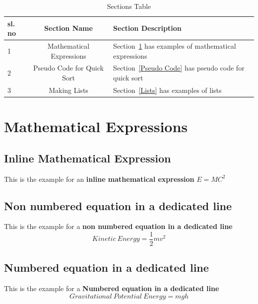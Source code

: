 \documentclass{article}
\begin{document}
\begin{table}                                                       %
    \centering
    \begin{tabular}{| l| c |p{8cm} |}
        \hline
         sl. no & Section Name & Section Description \\
         \hline
         1 & Mathematical Expressions & Section~\ref{Mathematical} has examples of mathematical expressions  \\
         2 & Pseudo Code for Quick Sort & Section~\ref{Pseudo Code} has pseudo code for quick sort \\
         3 & Making Lists &  Section~\ref{Lists} has examples of lists\\
         \hline
         
    \end{tabular}
    \caption{Sections Table}
    \label{tab:Section table}
\end{table}

\clearpage
\section{Mathematical Expressions} \label{Mathematical}         %
\subsection{Inline Mathematical Expression}                     %
This is the example for an \textbf{\textcolor{RoyalPurple}{inline mathematical expression}} $E=MC^2$ \cite{einstein1979general} 
                                                                
\subsection{Non numbered equation in a dedicated line}
This is the example for a \textbf{\textcolor{RoyalPurple}{non numbered equation in a dedicated line}} 
\begin{equation}
    Kinetic \ Energy = \frac{1}{2}mv^2 \nonumber
    \label{eq:KE}
\end{equation}

\subsection{Numbered equation in a dedicated line}
This is the example for a \textbf{\textcolor{RoyalPurple}{Numbered equation in a dedicated line}} 
\begin{equation}
    Gravitational \ Potential \ Energy = mgh
    \label{eq:GPU}                                              %
\end{equation}
\end{document}
